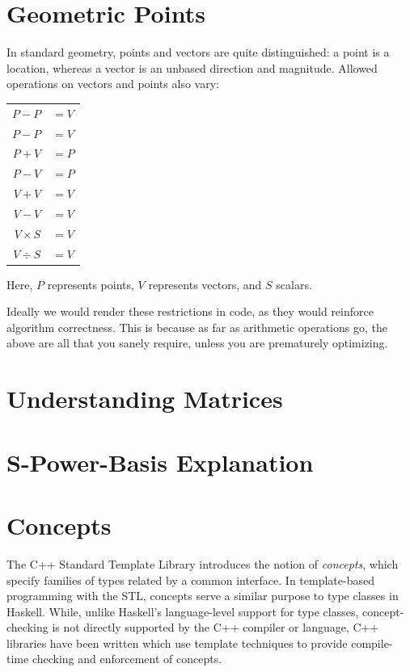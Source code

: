 \documentclass[openany]{book}
\begin{document}
\section{Geometric Points}
In standard geometry, points and vectors are quite distinguished: a
point is a location, whereas a vector is an unbased direction and
magnitude.  Allowed operations on vectors and points also vary:

\begin{tabular}{r l}
  $P - P$ & $= V$ \\

  $P - P$ & $= V$ \\

  $P + V$ & $= P$ \\

  $P - V$ & $= P$ \\

  $V + V$ & $= V$ \\

  $V - V$ & $= V$ \\

  $V \times S$ & $= V$ \\

  $V \div S$ & $= V$ \\
\end{tabular}

Here, $P$ represents points, $V$ represents vectors, and $S$ scalars.

Ideally we would render these restrictions in code, as they would
reinforce algorithm correctness.  This is because as far as arithmetic
operations go, the above are all that you sanely require, unless you
are prematurely optimizing.

\section{Understanding Matrices}

\section{S-Power-Basis Explanation}

\section{Concepts}

The C++ Standard Template Library\cite{stl} introduces the notion of
\emph{concepts}\cite{stl_concepts}, which specify families of types related
by a common interface.  In template-based programming with the STL, concepts
serve a similar purpose to type classes in Haskell.  While, unlike Haskell's
language-level support for type classes, concept-checking is not directly
supported by the C++ compiler or language, C++ libraries have been written
which use template techniques to provide compile-time checking and enforcement
of concepts\cite{boost_concept_check}.
\end{document}
